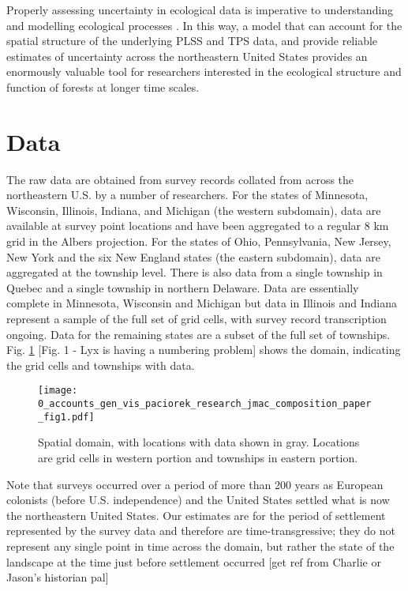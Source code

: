 \documentclass[12pt]{article}\usepackage[]{graphicx}\usepackage[]{color}
\begin{document}
Properly assessing uncertainty in ecological data is imperative to
understanding and modelling ecological processes \citep{cressie2009accounting}.
In this way, a model that can account for the spatial structure of
the underlying PLSS and TPS data, and provide reliable estimates of
uncertainty across the northeastern United States provides an enormously
valuable tool for researchers interested in the ecological structure
and function of forests at longer time scales.


\section{Data}

The raw data are obtained from survey records collated from across
the northeastern U.S. by a number of researchers. For the states of
Minnesota, Wisconsin, Illinois, Indiana, and Michigan (the western
subdomain), data are available at survey point locations and have
been aggregated to a regular 8 km grid in the Albers projection. For
the states of Ohio, Pennsylvania, New Jersey, New York and the six
New England states (the eastern subdomain), data are aggregated at
the township level. There is also data from a single township in Quebec
and a single township in northern Delaware. Data are essentially complete
in Minnesota, Wisconsin and Michigan but data in Illinois and Indiana
represent a sample of the full set of grid cells, with survey record
transcription ongoing. Data for the remaining states are a subset
of the full set of townships. Fig. \ref{fig:domain} {[}Fig. 1 - Lyx
is having a numbering problem{]} shows the domain, indicating the
grid cells and townships with data.

\begin{figure}
\label{fig:domain}\texttt{[image: 0\_accounts\_gen\_vis\_paciorek\_research\_jmac\_composition\_paper\_fig1.pdf]}

\caption{Spatial domain, with locations with data shown in gray. Locations
are grid cells in western portion and townships in eastern portion.}
\end{figure}


Note that surveys occurred over a period of more than 200 years as
European colonists (before U.S. independence) and the United States
settled what is now the northeastern United States. Our estimates
are for the period of settlement represented by the survey data and
therefore are time-transgressive; they do not represent any single
point in time across the domain, but rather the state of the landscape
at the time just before settlement occurred {[}get ref from Charlie
or Jason's historian pal{]}
\end{document}
